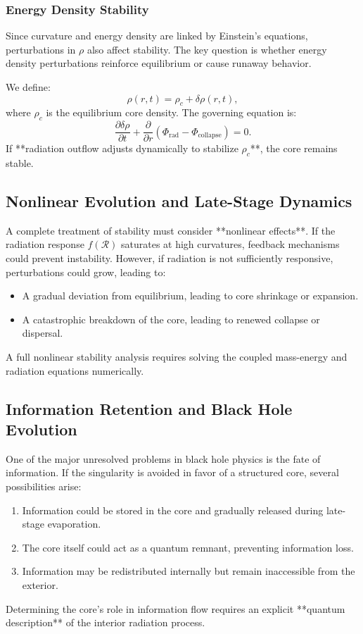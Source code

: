 \subsubsection{Energy Density Stability}
Since curvature and energy density are linked by Einstein’s equations, perturbations in \( \rho \) also affect stability. The key question is whether energy density perturbations reinforce equilibrium or cause runaway behavior.

We define:
\begin{equation}
    \rho(r,t) = \rho_c + \delta \rho(r,t),
\end{equation}
where \( \rho_c \) is the equilibrium core density. The governing equation is:
\begin{equation}
    \frac{\partial \delta \rho}{\partial t} + \frac{\partial}{\partial r} \left( \Phi_\text{rad} - \Phi_\text{collapse} \right) = 0.
\end{equation}
If **radiation outflow adjusts dynamically to stabilize \( \rho_c \)**, the core remains stable.

\subsection{Nonlinear Evolution and Late-Stage Dynamics}
A complete treatment of stability must consider **nonlinear effects**. If the radiation response \( f(\mathcal{R}) \) saturates at high curvatures, feedback mechanisms could prevent instability. However, if radiation is not sufficiently responsive, perturbations could grow, leading to:
\begin{itemize}
    \item A gradual deviation from equilibrium, leading to core shrinkage or expansion.
    \item A catastrophic breakdown of the core, leading to renewed collapse or dispersal.
\end{itemize}

A full nonlinear stability analysis requires solving the coupled mass-energy and radiation equations numerically.

\subsection{Information Retention and Black Hole Evolution}
One of the major unresolved problems in black hole physics is the fate of information. If the singularity is avoided in favor of a structured core, several possibilities arise:
\begin{enumerate}
    \item Information could be stored in the core and gradually released during late-stage evaporation.
    \item The core itself could act as a quantum remnant, preventing information loss.
    \item Information may be redistributed internally but remain inaccessible from the exterior.
\end{enumerate}
Determining the core’s role in information flow requires an explicit **quantum description** of the interior radiation process.

